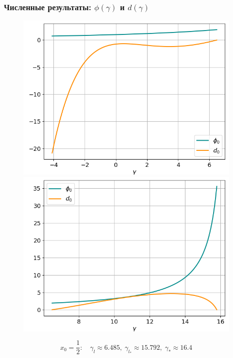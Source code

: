 \documentclass[fullscreen=true, unicode, bookmarks=false]{beamer}
\begin{document}
\begin{frame}
\frametitle{ Численные результаты: $ \phi(\gamma) $ и $ d(\gamma) $ }

\begin{figure} 
\includegraphics[scale=0.37]{divergent_phi0d0_12_1.png}  
\hfill
\includegraphics[scale=0.37]{divergent_phi0d0_12_2.png}  
\end{figure}

$$ x_0 = \frac{1}{2}: \quad \gamma_l \approx 6.485, \; \gamma_{l_*} \approx 15.792, \; \gamma_* \approx 16.4 $$

\end{frame}
\end{document}
